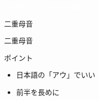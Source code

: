 \documentclass[aspectratio=169,xcolor={dvipsnames,table}]{beamer}
\begin{document}
\begin{frame}
\hypertarget{today}{}

\centering
  \textcolor{white}{\Huge\bfseries Today's Pronunciation}

 \vspace{30pt}

  \textcolor{white}{\Huge\bfseries {}}
\end{frame}
\begin{frame}[plain]{二重母音 }

 {\Large 二重母音} {\Huge {}}


\normalsize
ポイント

\begin{itemize}[circle]
 \item 日本語の「アウ」でいい
 \item 前半を長めに
\end{itemize}

\hfill\hyperlink{ex}{}

\end{frame}
\end{document}
